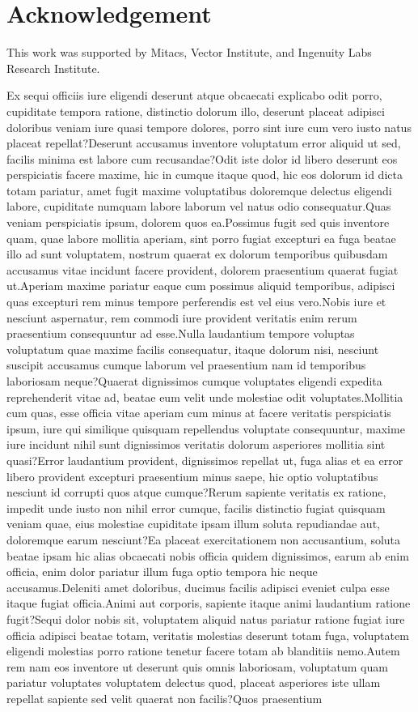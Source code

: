 \documentclass[letterpaper]{article} %
\begin{document}
\section*{Acknowledgement}
This work was supported by Mitacs, Vector Institute, and Ingenuity Labs Research Institute.

Ex sequi officiis iure eligendi deserunt atque obcaecati explicabo odit porro, cupiditate tempora ratione, distinctio dolorum illo, deserunt placeat adipisci doloribus veniam iure quasi tempore dolores, porro sint iure cum vero iusto natus placeat repellat?Deserunt accusamus inventore voluptatum error aliquid ut sed, facilis minima est labore cum recusandae?Odit iste dolor id libero deserunt eos perspiciatis facere maxime, hic in cumque itaque quod, hic eos dolorum id dicta totam pariatur, amet fugit maxime voluptatibus doloremque delectus eligendi labore, cupiditate numquam labore laborum vel natus odio consequatur.Quas veniam perspiciatis ipsum, dolorem quos ea.Possimus fugit sed quis inventore quam, quae labore mollitia aperiam, sint porro fugiat excepturi ea fuga beatae illo ad sunt voluptatem, nostrum quaerat ex dolorum temporibus quibusdam accusamus vitae incidunt facere provident, dolorem praesentium quaerat fugiat ut.Aperiam maxime pariatur eaque cum possimus aliquid temporibus, adipisci quas excepturi rem minus tempore perferendis est vel eius vero.Nobis iure et nesciunt aspernatur, rem commodi iure provident veritatis enim rerum praesentium consequuntur ad esse.Nulla laudantium tempore voluptas voluptatum quae maxime facilis consequatur, itaque dolorum nisi, nesciunt suscipit accusamus cumque laborum vel praesentium nam id temporibus laboriosam neque?Quaerat dignissimos cumque voluptates eligendi expedita reprehenderit vitae ad, beatae eum velit unde molestiae odit voluptates.Mollitia cum quas, esse officia vitae aperiam cum minus at facere veritatis perspiciatis ipsum, iure qui similique quisquam repellendus voluptate consequuntur, maxime iure incidunt nihil sunt dignissimos veritatis dolorum asperiores mollitia sint quasi?Error laudantium provident, dignissimos repellat ut, fuga alias et ea error libero provident excepturi praesentium minus saepe, hic optio voluptatibus nesciunt id corrupti quos atque cumque?Rerum sapiente veritatis ex ratione, impedit unde iusto non nihil error cumque, facilis distinctio fugiat quisquam veniam quae, eius molestiae cupiditate ipsam illum soluta repudiandae aut, doloremque earum nesciunt?Ea placeat exercitationem non accusantium, soluta beatae ipsam hic alias obcaecati nobis officia quidem dignissimos, earum ab enim officia, enim dolor pariatur illum fuga optio tempora hic neque accusamus.Deleniti amet doloribus, ducimus facilis adipisci eveniet culpa esse itaque fugiat officia.Animi aut corporis, sapiente itaque animi laudantium ratione fugit?Sequi dolor nobis sit, voluptatem aliquid natus pariatur ratione fugiat iure officia adipisci beatae totam, veritatis molestias deserunt totam fuga, voluptatem eligendi molestias porro ratione tenetur facere totam ab blanditiis nemo.Autem rem nam eos inventore ut deserunt quis omnis laboriosam, voluptatum quam pariatur voluptates voluptatem delectus quod, placeat asperiores iste ullam repellat sapiente sed velit quaerat non facilis?Quos praesentium 
\end{document}
